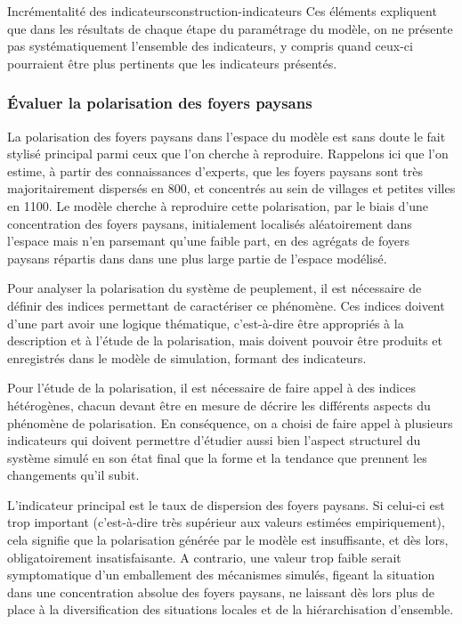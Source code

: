 \documentclass[12pt, a4paper, oneside]{book}
\begin{document}
\begin{encadre}{Incrémentalité des indicateurs}{construction-indicateurs}
		Ces éléments expliquent que dans les résultats de chaque étape du paramétrage du modèle, on ne présente pas systématiquement l'ensemble des indicateurs, y compris quand ceux-ci pourraient être plus pertinents que les indicateurs présentés.
	\end{encadre}
	
	
	\pagebreak
	\subsubsection{Évaluer la polarisation des foyers paysans \label{subsub:polarisation}}
	
	La polarisation des foyers paysans dans l'espace du modèle est sans doute le fait stylisé principal parmi ceux que l'on cherche à reproduire. Rappelons ici que l'on estime, à partir des connaissances d'experts, que les foyers paysans sont très majoritairement dispersés en 800, et concentrés au sein de villages et petites villes en 1100.
	Le modèle cherche à reproduire cette polarisation, par le biais d'une concentration des foyers paysans, initialement localisés aléatoirement dans l'espace mais n'en parsemant qu'une faible part, en des agrégats de foyers paysans répartis dans dans une plus large partie de l'espace modélisé.
	
	Pour analyser la polarisation du système de peuplement, il est nécessaire de définir des indices permettant de caractériser ce phénomène. Ces indices doivent d'une part avoir une logique thématique, c'est-à-dire être appropriés à la description et à l'étude de la polarisation, mais doivent  pouvoir être produits et enregistrés dans le modèle de simulation, formant des indicateurs.
	
	Pour l'étude de la polarisation, il est nécessaire de faire appel à des indices hétérogènes, chacun devant être en mesure de décrire les différents aspects du phénomène de polarisation. En conséquence, on a choisi de faire appel à plusieurs indicateurs qui doivent permettre d'étudier aussi bien l'aspect structurel du système simulé en son état final que la forme et la tendance que prennent les changements qu'il subit.
	
	L'indicateur principal est le taux de dispersion des foyers paysans. Si celui-ci est trop important (c'est-à-dire très supérieur aux valeurs estimées empiriquement), cela signifie que la polarisation générée par le modèle est insuffisante, et dès lors, obligatoirement insatisfaisante. A contrario, une valeur trop faible serait symptomatique d'un emballement des mécanismes simulés, figeant la situation dans une concentration absolue des foyers paysans, ne laissant dès lors plus de place à la diversification des situations locales et de la hiérarchisation d'ensemble.
	
\end{document}
